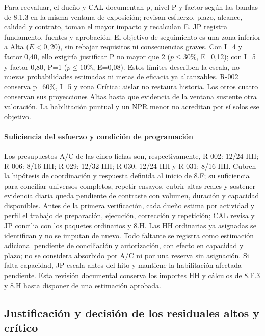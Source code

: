 Para reevaluar, el dueño y CAL documentan p, nivel P y factor según las bandas
de 8.1.3 en la misma ventana de exposición; revisan esfuerzo, plazo, alcance,
calidad y contrato, toman el mayor impacto y recalculan E. JP registra fundamento,
fuentes y aprobación. El objetivo de seguimiento es una zona inferior a Alta
($E<0,20$), sin rebajar requisitos ni consecuencias graves. Con I=4 y factor 0,40,
ello exigiría justificar P no mayor que 2 ($p\leq30\%$, E=0,12); con I=5 y factor
0,80, P=1 ($p\leq10\%$, E=0,08). Estos límites describen la escala, no nuevas
probabilidades estimadas ni metas de eficacia ya alcanzables. R-002 conserva
p=60\%, I=5 y zona Crítica: aislar no restaura historia. Los otros cuatro conservan
sus proyecciones Altas hasta que evidencia de la ventana sustente otra valoración.
La habilitación puntual y un NPR menor no acreditan por sí solos ese objetivo.

\paragraph{Suficiencia del esfuerzo y condición de programación}
Los presupuestos A/C de las cinco fichas son, respectivamente, R-002: 12/24 HH;
R-006: 8/16 HH; R-029: 12/32 HH; R-030: 12/24 HH y R-031: 8/16 HH.
Cubren la hipótesis de coordinación y respuesta definida al inicio de 8.F;
su suficiencia para conciliar universos completos, repetir ensayos, cubrir altas
reales y sostener evidencia diaria queda pendiente de contraste con volumen,
duración y capacidad disponibles. Antes de la primera verificación, cada dueño
estima por actividad y perfil el trabajo de preparación, ejecución, corrección y
repetición; CAL revisa y JP concilia con los paquetes ordinarios y 8.H.
Las HH ordinarias ya asignadas se identifican y no se imputan de nuevo. Todo
faltante se registra como estimación adicional pendiente de conciliación y
autorización, con efecto en capacidad y plazo; no se considera absorbido por A/C
ni por una reserva sin asignación. Si falta capacidad, JP escala antes del hito y
mantiene la habilitación afectada pendiente. Esta revisión documental conserva
los importes HH y cálculos de 8.F.3 y 8.H hasta disponer de una estimación aprobada.

\subsection*{Justificación y decisión de los residuales altos y crítico}
\label{sec:residuales-prioritarios}

